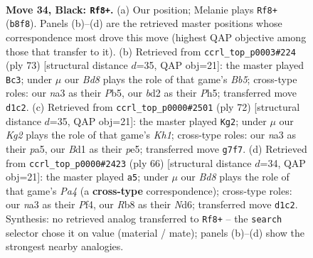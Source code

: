 \documentclass[11pt]{article}
\begin{document}
\clearpage

\begin{figure}[p]\centering
\begin{subfigure}{0.46\textwidth}\centering
\resizebox{\linewidth}{!}{%
\newchessgame
\chessboard[
  setfen={1r6/pp4k1/8/2p3r1/4p3/N3P3/PP1B1K2/R2b4 b - - 3 34},
  showmover=false,
  pgfstyle=straightmove, color=movearrow, markmove={b8-f8}
]}
\caption{}
\end{subfigure}\hfill
\begin{subfigure}{0.46\textwidth}\centering
\resizebox{\linewidth}{!}{%
\newchessgame
\chessboard[
  setfen={2r3k1/5p2/6p1/1p1P3p/1b1B4/5P1P/5P2/1R4K1 b - - 1 37},
  showmover=false,
  pgfstyle=straightmove, color=movearrow, markmove={b4-c3}
]}
\caption{}
\end{subfigure}
\\[4pt]
\begin{subfigure}{0.46\textwidth}\centering
\resizebox{\linewidth}{!}{%
\newchessgame
\chessboard[
  setfen={4r3/6k1/2pB2Pp/p3p1b1/8/1PP4P/P7/5R1K w - - 1 37},
  showmover=false,
  pgfstyle=straightmove, color=movearrow, markmove={h1-g2}
]}
\caption{}
\end{subfigure}\hfill
\begin{subfigure}{0.46\textwidth}\centering
\resizebox{\linewidth}{!}{%
\newchessgame
\chessboard[
  setfen={6k1/5pp1/3N1n2/8/Pr1p1P1p/7P/6P1/R5K1 w - - 0 34},
  showmover=false,
  pgfstyle=straightmove, color=movearrow, markmove={a4-a5}
]}
\caption{}
\end{subfigure}
\caption{\textbf{Move 34, Black: \texttt{Rf8+}.} (a) Our position; Melanie plays \texttt{Rf8+} (\texttt{b8f8}). Panels (b)--(d) are the retrieved master positions whose correspondence most drove this move (highest QAP objective among those that transfer to it). (b) Retrieved from \texttt{ccrl\_top\_p0003\#224} (ply 73) [structural distance $d$=35, QAP obj=21]: the master played \texttt{Bc3}; under $\mu$ our \emph{Bd8} plays the role of that game's \emph{Bb5}; cross-type roles: our \emph{n}a3 as their \emph{P}b5, our \emph{b}d2 as their \emph{P}h5; transferred move \texttt{d1c2}. (c) Retrieved from \texttt{ccrl\_top\_p0000\#2501} (ply 72) [structural distance $d$=35, QAP obj=21]: the master played \texttt{Kg2}; under $\mu$ our \emph{Kg2} plays the role of that game's \emph{Kh1}; cross-type roles: our \emph{n}a3 as their \emph{p}a5, our \emph{B}d1 as their \emph{p}e5; transferred move \texttt{g7f7}. (d) Retrieved from \texttt{ccrl\_top\_p0000\#2423} (ply 66) [structural distance $d$=34, QAP obj=21]: the master played \texttt{a5}; under $\mu$ our \emph{Bd8} plays the role of that game's \emph{Pa4} (a \textbf{cross-type} correspondence); cross-type roles: our \emph{n}a3 as their \emph{P}f4, our \emph{R}b8 as their \emph{N}d6; transferred move \texttt{d1c2}. Synthesis: no retrieved analog transferred to \texttt{Rf8+} -- the \texttt{search} selector chose it on value (material / mate); panels (b)--(d) show the strongest nearby analogies.}
\label{fig:thought-m67}
\end{figure}
\end{document}
